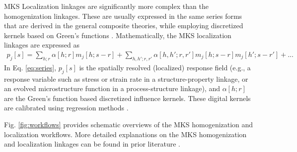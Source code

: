 \documentclass{bmcart}
\begin{document}
MKS Localization linkages are significantly more complex than the
homogenization linkages. These are usually expressed in the same
series forms that are derived in the general composite theories, while
employing discretized kernels based on Green's functions
\cite{brown1955solid, hill1963elastic, kroner1986statistical,
  kroner1977bounds, kroner1972statistical, etingof1993representations,
  adams1998mesostructure, fullwood2008strong, torquato2013random,
  li2006quantitative, milhans2011prediction, adams2013microstructure,
  garmestani2001statistical}. Mathematically, the MKS localization
linkages are expressed as
\begin{multline}
    \label{eq:series}
    p_j[s] = \sum_{h; r} \alpha[h; r] m_j[h; s - r] + \sum_{h, h'; r, r'}
    \alpha[h, h'; r, r'] m_j[h; s - r] m_j[h'; s - r'] + ...
\end{multline}
In Eq. \ref{eq:series}, $p_j[s]$ is the spatially resolved (localized)
response field (e.g., a response variable such as stress or strain
rate in a structure-property linkage, or an evolved microstructure
function in a process-structure linkage), and $\alpha[h; r]$ are
the Green's function based discretized influence kernels. These
digital kernels are calibrated using regression methods
\cite{al2012multi, kalidindi2010novel, landi2010multi,
  yabansu2014calibrated, yabansu2015representation,
  brough2016microstructure}.

Fig. \ref{fig:workflows} provides schematic overviews of
the MKS homogenization and localization workflows. More detailed
explanations on the MKS homogenization and localization linkages
can be found in prior literature \cite{landi2010multi, kalidindi2010novel,
yabansu2014calibrated, al2012multi, kalidindi2011microstructure,
gupta2015structure, brough2016microstructure, cceccen2014data,
niezgoda2013novel, niezgoda2011understanding, cecen2016versatile}.
\end{document}
